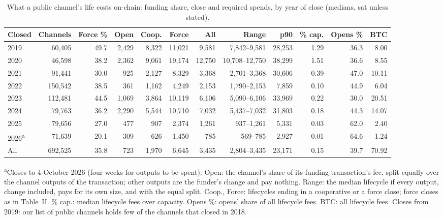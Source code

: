 \begin{table}[t]
\centering
\caption{What a public channel's life costs on-chain: funding share, close and required spends, by year of close (medians, sat unless stated).}
\label{tab:lifecycle}
\footnotesize
\begin{tabular}{lrrrrrrrrrrr}
\toprule
Closed & Channels & Force \% & Open & Coop. & Force & All & Range & p90 & \% cap. & Opens \% & BTC \\
\midrule
2019 & 60{,}405 & 49.7 & 2{,}429 & 8{,}322 & 11{,}021 & 9{,}581 & 7{,}842--9{,}581 & 28{,}253 & 1.29 & 36.3 & 8.00 \\
2020 & 46{,}598 & 38.2 & 2{,}362 & 9{,}061 & 19{,}174 & 12{,}750 & 10{,}708--12{,}750 & 38{,}299 & 1.51 & 36.6 & 8.55 \\
2021 & 91{,}441 & 30.0 & 925 & 2{,}127 & 8{,}329 & 3{,}368 & 2{,}701--3{,}368 & 30{,}606 & 0.39 & 47.0 & 10.11 \\
2022 & 150{,}542 & 38.5 & 361 & 1{,}162 & 4{,}249 & 2{,}153 & 1{,}790--2{,}153 & 7{,}859 & 0.10 & 44.9 & 6.04 \\
2023 & 112{,}481 & 44.5 & 1{,}069 & 3{,}864 & 10{,}119 & 6{,}106 & 5{,}090--6{,}106 & 33{,}969 & 0.22 & 30.0 & 20.51 \\
2024 & 79{,}763 & 36.2 & 2{,}290 & 5{,}544 & 10{,}710 & 7{,}032 & 5{,}437--7{,}032 & 31{,}803 & 0.18 & 44.3 & 14.07 \\
2025 & 79{,}656 & 27.0 & 477 & 907 & 2{,}374 & 1{,}261 & 937--1{,}261 & 5{,}331 & 0.03 & 62.0 & 2.40 \\
2026\textsuperscript{a} & 71{,}639 & 20.1 & 309 & 626 & 1{,}450 & 785 & 569--785 & 2{,}927 & 0.01 & 64.6 & 1.24 \\
\midrule
All & 692{,}525 & 35.8 & 723 & 1{,}970 & 6{,}645 & 3{,}435 & 2{,}804--3{,}435 & 23{,}171 & 0.15 & 39.7 & 70.92 \\
\bottomrule
\end{tabular}
\par\smallskip\parbox{\linewidth}{\scriptsize \textsuperscript{a}Closes to 4 October 2026 (four weeks for outputs to be spent). Open: the channel's share of its funding transaction's fee, split equally over the channel outputs of the transaction; other outputs are the funder's change and pay nothing. Range: the median lifecycle if every output, change included, pays for its own size, and with the equal split. Coop., Force: lifecycles ending in a cooperative or a force close; force closes as in Table~II. \% cap.: median lifecycle fees over capacity. Opens \%: opens' share of all lifecycle fees. BTC: all lifecycle fees. Closes from 2019: our list of public channels holds few of the channels that closed in 2018.}
\end{table}
